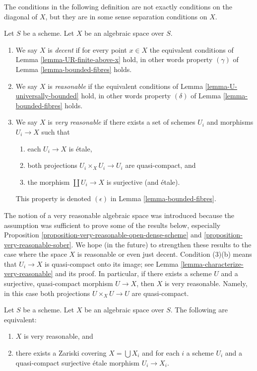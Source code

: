\noindent
The conditions in the following definition
are not exactly conditions on the diagonal of $X$, but they are in some
sense separation conditions on $X$.

\begin{definition}
\label{definition-very-reasonable}
Let $S$ be a scheme.
Let $X$ be an algebraic space over $S$.
\begin{enumerate}
\item We say $X$ is {\it decent} if for every point $x \in X$ the equivalent
conditions of Lemma \ref{lemma-UR-finite-above-x} hold, in other words
property $(\gamma)$ of
Lemma \ref{lemma-bounded-fibres}
holds.
\item We say $X$ is {\it reasonable} if the equivalent conditions of
Lemma \ref{lemma-U-universally-bounded}
hold, in other words property $(\delta)$ of
Lemma \ref{lemma-bounded-fibres}
holds.
\item We say $X$ is {\it very reasonable} if there exists a set of schemes
$U_i$ and morphisms $U_i \to X$ such that
\begin{enumerate}
\item each $U_i \to X$ is \'etale,
\item both projections $U_i \times_X U_i \to U_i$ are
quasi-compact, and
\item the morphism $\coprod U_i \to X$ is surjective (and \'etale).
\end{enumerate}
This property is denoted $(\epsilon)$ in
Lemma \ref{lemma-bounded-fibres}.
\end{enumerate}
\end{definition}

\noindent
The notion of a very reasonable algebraic space was introduced because
the assumption was sufficient to prove some of the results below, especially
Proposition \ref{proposition-very-reasonable-open-dense-scheme} and
\ref{proposition-very-reasonable-sober}.
We hope (in the future) to strengthen these results to
the case where the space $X$ is reasonable or even just decent.
Condition (3)(b) means that $U_i \to X$ is quasi-compact onto its image;
see Lemma \ref{lemma-characterize-very-reasonable} and its proof.
In particular, if there exists a scheme $U$ and a surjective, quasi-compact
morphism $U \to X$, then $X$ is very reasonable. Namely, in this case both
projections $U \times_X U \to U$ are quasi-compact.

\begin{lemma}
\label{lemma-characterize-very-reasonable}
Let $S$ be a scheme.
Let $X$ be an algebraic space over $S$.
The following are equivalent:
\begin{enumerate}
\item $X$ is very reasonable, and
\item there exists a Zariski covering $X = \bigcup X_i$ and for
each $i$ a scheme $U_i$ and a quasi-compact surjective \'etale
morphism $U_i \to X_i$.
\end{enumerate}
\end{lemma}


